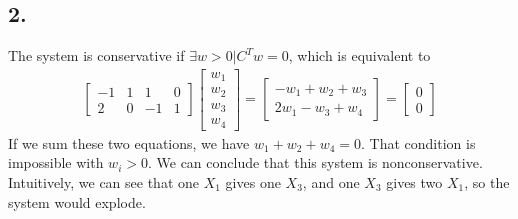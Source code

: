 \subsection*{2.}
The system is conservative if $\exists w>0 | C^Tw = 0$, which is equivalent to
\begin{eqnarray*}
\begin{bmatrix}
-1 & 1 & 1 &0\\
2 & 0 & -1 & 1
\end{bmatrix}
\begin{bmatrix}
w_1 \\
w_2\\
w_3\\
w_4
\end{bmatrix} = \begin{bmatrix}
-w_1+w_2+w_3 \\
2w_1-w_3+w_4
\end{bmatrix} = \begin{bmatrix}
0 \\
0
\end{bmatrix}
\end{eqnarray*}
If we sum these two equations, we have $w_1+w_2+w_4=0$. That condition is impossible with $w_i > 0$. We can conclude that this system is nonconservative. Intuitively, we can see that one $X_1$ gives one $X_3$, and one $X_3$ gives two $X_1$, so the system would explode.

